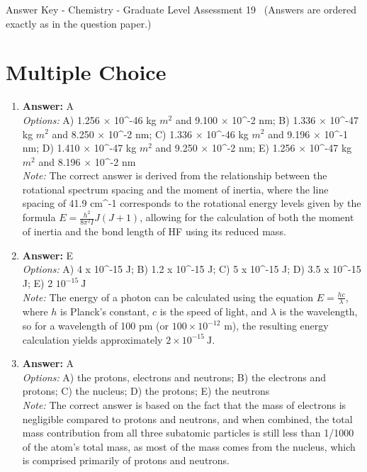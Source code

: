 \documentclass[12pt]{article}
\begin{document}
\begin{center}
Answer Key - Chemistry - Graduate Level Assessment 19 \
\small (Answers are ordered exactly as in the question paper.)
\end{center}

\section*{Multiple Choice}
\begin{enumerate}[label=\arabic*.]
\item \textbf{Answer:} A
\\ \textit{Options:} A) 1.256 \ensuremath{\times} 10^-46 kg $m^2$ and 9.100 \ensuremath{\times} 10^-2 nm; B) 1.336 \ensuremath{\times} 10^-47 kg $m^2$ and 8.250 \ensuremath{\times} 10^-2 nm; C) 1.336 \ensuremath{\times} 10^-46 kg $m^2$ and 9.196 \ensuremath{\times} 10^-1 nm; D) 1.410 \ensuremath{\times} 10^-47 kg $m^2$ and 9.250 \ensuremath{\times} 10^-2 nm; E) 1.256 \ensuremath{\times} 10^-47 kg $m^2$ and 8.196 \ensuremath{\times} 10^-2 nm
\\ \textit{Note:} The correct answer is derived from the relationship between the rotational spectrum spacing and the moment of inertia, where the line spacing of 41.9 cm^-1 corresponds to the rotational energy levels given by the formula \(E = \frac{h^2}{8\pi^2 I} J(J+1)\), allowing for the calculation of both the moment of inertia and the bond length of HF using its reduced mass.
\item \textbf{Answer:} E
\\ \textit{Options:} A) 4 x 10^-15 J; B) 1.2 x 10^-15 J; C) 5 x 10^-15 J; D) 3.5 x 10^-15 J; E) 2 $10^{-15} \mathrm{~J}$
\\ \textit{Note:} The energy of a photon can be calculated using the equation \(E = \frac{hc}{\lambda}\), where \(h\) is Planck's constant, \(c\) is the speed of light, and \(\lambda\) is the wavelength, so for a wavelength of 100 pm (or \(100 \times 10^{-12}\) m), the resulting energy calculation yields approximately \(2 \times 10^{-15} \mathrm{~J}\).
\item \textbf{Answer:} A
\\ \textit{Options:} A) the protons, electrons and neutrons; B) the electrons and protons; C) the nucleus; D) the protons; E) the neutrons
\\ \textit{Note:} The correct answer is based on the fact that the mass of electrons is negligible compared to protons and neutrons, and when combined, the total mass contribution from all three subatomic particles is still less than 1/1000 of the atom's total mass, as most of the mass comes from the nucleus, which is comprised primarily of protons and neutrons.

\end{enumerate}
\end{document}
